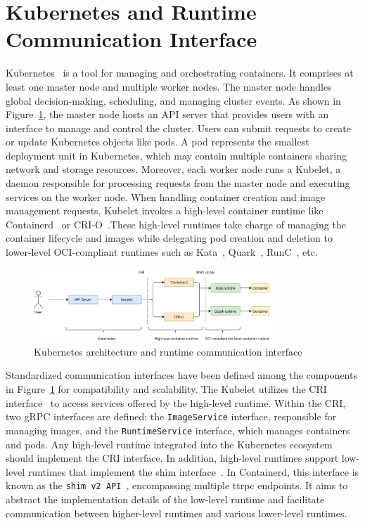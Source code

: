 \section{Kubernetes and Runtime Communication Interface}
\label{sec:k8s}
Kubernetes~\cite*{k8s} is a tool for managing and orchestrating containers. It comprises at least one master node and multiple worker nodes. The master node handles global decision-making, scheduling, and managing cluster events. As shown in Figure~\ref{fig:k8s}, 
the master node hosts an API server that provides users with an interface to manage and control the cluster. Users can submit requests to create or update Kubernetes objects like pods. A pod represents the smallest deployment unit in Kubernetes, which may contain multiple containers sharing network 
and storage resources. Moreover, each worker node runs a Kubelet, a daemon responsible for processing requests from the master node and executing services on the worker node. When handling container creation and image management requests, Kubelet invokes a high-level container runtime like 
Containerd~\cite*{containerd} or CRI-O~\cite*{cri-o}.These high-level runtimes take charge of managing the container lifecycle and images while delegating pod creation and 
deletion to lower-level OCI-compliant runtimes such as Kata~\cite*{Kata-Containers}, Quark~\cite*{quark}, RunC~\cite*{runc}, etc.
\begin{figure}[htp]
  \centering
  \includegraphics[width=0.8\textwidth]{images/k8s.PNG}
  \caption[Kubernetes architecture and runtime communication interface]{Kubernetes architecture and runtime communication interface}
  \label{fig:k8s}
\end{figure}

Standardized communication interfaces have been defined among the components in Figure~\ref{fig:k8s} for compatibility and scalability. The Kubelet utilizes the CRI interface~\cite*{cri-interface} to access services offered by the high-level runtime. Within the CRI, two gRPC interfaces are defined: 
the \texttt{ImageService} interface, responsible for managing images, and the \texttt{RuntimeService} interface, which manages containers and pods. Any high-level runtime integrated into the Kubernetes ecosystem should implement the CRI interface. In addition, high-level runtimes support low-level 
runtimes that implement the shim interface~\cite*{shim_v2, cri0_shim_v2}. In Containerd, this interface is known as the \texttt{shim v2 API}~\cite*{shim_v2}, encompassing multiple ttrpc endpoints. It aims to abstract the implementation details of the low-level runtime and facilitate 
communication between higher-level runtimes and various lower-level runtimes.


